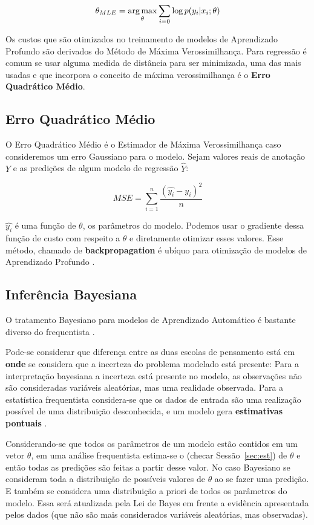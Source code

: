 \begin{equation}
        \label{eq:objver}
  \theta_{MLE} = \operatorname*{arg\,max}_{\theta}\sum_{i=0}\log p( y_i | x_i ; \theta)
\end{equation}


Os custos que são otimizados no treinamento de modelos de Aprendizado Profundo
são derivados do Método de Máxima Verossimilhança. Para regressão é comum se
usar alguma medida de distância para ser minimizada, uma das mais usadas e que
incorpora o conceito de máxima verossimilhança é o \textbf{Erro
Quadrático Médio}.



\subsection{Erro Quadrático Médio}
\label{sec:MSE}


O Erro Quadrático Médio é o Estimador de Máxima Verossimilhança caso
consideremos um erro Gaussiano para o modelo. Sejam valores reais de anotação $Y$ e as
predições de algum modelo de regressão $\hat{Y}$:

\[MSE = \sum^n_{i=1}\frac{(\hat{y_i} - y_i)^2}{n}\]


$\hat{y_i}$ é uma função de $\theta$, os parâmetros do modelo. Podemos usar o gradiente dessa função de custo com respeito a $\theta$ e diretamente otimizar esses valores. Esse método, chamado de \textbf{backpropagation} é ubíquo para otimização de modelos de Aprendizado Profundo \citep{dlbook}.



\subsection{Inferência Bayesiana} 
\label{sec:bayesinf}
O tratamento Bayesiano para modelos de Aprendizado Automático é bastante diverso do frequentista \citep{dlbook}.

Pode-se considerar que diferença entre as duas escolas de pensamento está em
\textbf{onde} se considera que a incerteza do problema modelado está presente: Para a
interpretação bayesiana a incerteza está presente no modelo, as observações não
são consideradas variáveis aleatórias, mas uma realidade observada. Para a estatística frequentista
considera-se que os dados de entrada são uma realização possível de uma
distribuição desconhecida, e um modelo gera \textbf{estimativas pontuais} \citep{rethink}.

Considerando-se que todos os parâmetros de um modelo estão contidos em um vetor
$\theta$, em uma análise frequentista estima-se o  (checar Sessão~\ref{sec:est}) de $\theta$ e então todas as
predições são feitas a partir desse valor. No caso Bayesiano se consideram toda
a distribuição de possíveis valores de $\theta$ ao se fazer uma predição. E
também se considera uma distribuição a priori de todos os parâmetros do modelo.
Essa será atualizada pela Lei de Bayes em frente a evidência apresentada pelos
dados (que não são mais considerados variáveis aleatórias, mas observadas).

